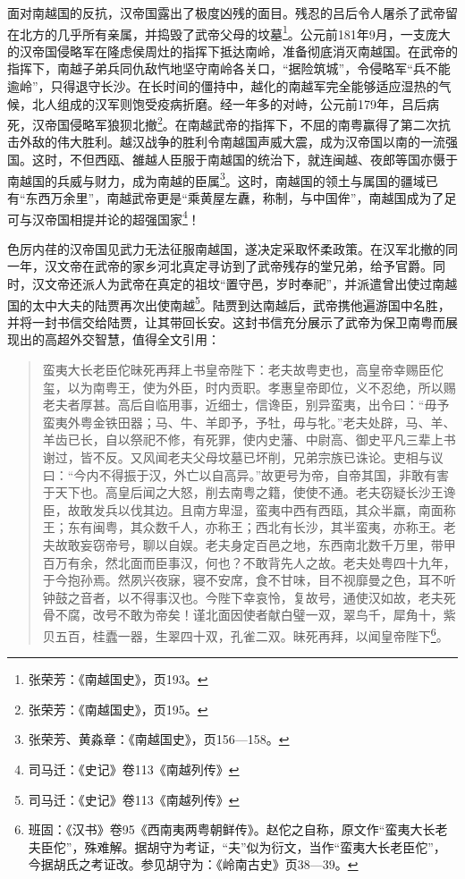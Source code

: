 面对南越国的反抗，汉帝国露出了极度凶残的面目。残忍的吕后令人屠杀了武帝留在北方的几乎所有亲属，并捣毁了武帝父母的坟墓\footnote{ 张荣芳：《南越国史》，页193。}。公元前181年9月，一支庞大的汉帝国侵略军在隆虑侯周灶的指挥下抵达南岭，准备彻底消灭南越国。在武帝的指挥下，南越子弟兵同仇敌忾地坚守南岭各关口，“据险筑城”，令侵略军“兵不能逾岭”，只得退守长沙。在长时间的僵持中，越化的南越军完全能够适应湿热的气候，北人组成的汉军则饱受疫病折磨。经一年多的对峙，公元前179年，吕后病死，汉帝国侵略军狼狈北撤\footnote{ 张荣芳：《南越国史》，页195。}。在南越武帝的指挥下，不屈的南粤赢得了第二次抗击外敌的伟大胜利。越汉战争的胜利令南越国声威大震，成为汉帝国以南的一流强国。这时，不但西瓯、雒越人臣服于南越国的统治下，就连闽越、夜郎等国亦慑于南越国的兵威与财力，成为南越的臣属\footnote{ 张荣芳、黄淼章：《南越国史》，页156—158。}。这时，南越国的领土与属国的疆域已有“东西万余里”，南越武帝更是“乘黄屋左纛，称制，与中国侔”，南越国成为了足可与汉帝国相提并论的超强国家\footnote{ 司马迁：《史记》卷113《南越列传》}！

色厉内荏的汉帝国见武力无法征服南越国，遂决定采取怀柔政策。在汉军北撤的同一年，汉文帝在武帝的家乡河北真定寻访到了武帝残存的堂兄弟，给予官爵。同时，汉文帝还派人为武帝在真定的祖坟“置守邑，岁时奉祀”，并派遣曾出使过南越国的太中大夫的陆贾再次出使南越\footnote{ 司马迁：《史记》卷113《南越列传》}。陆贾到达南越后，武帝携他遍游国中名胜，并将一封书信交给陆贾，让其带回长安。这封书信充分展示了武帝为保卫南粤而展现出的高超外交智慧，值得全文引用：

\begin{quote}
	蛮夷大长老臣佗昧死再拜上书皇帝陛下：老夫故粤吏也，高皇帝幸赐臣佗玺，以为南粤王，使为外臣，时内贡职。孝惠皇帝即位，义不忍绝，所以赐老夫者厚甚。高后自临用事，近细士，信谗臣，别异蛮夷，出令曰：“毋予蛮夷外粤金铁田器；马、牛、羊即予，予牡，毋与牝。”老夫处辟，马、羊、羊齿已长，自以祭祀不修，有死罪，使内史藩、中尉高、御史平凡三辈上书谢过，皆不反。又风闻老夫父母坟墓已坏削，兄弟宗族已诛论。吏相与议曰：“今内不得振于汉，外亡以自高异。”故更号为帝，自帝其国，非敢有害于天下也。高皇后闻之大怒，削去南粤之籍，使使不通。老夫窃疑长沙王谗臣，故敢发兵以伐其边。且南方卑湿，蛮夷中西有西瓯，其众半羸，南面称王；东有闽粤，其众数千人，亦称王；西北有长沙，其半蛮夷，亦称王。老夫故敢妄窃帝号，聊以自娱。老夫身定百邑之地，东西南北数千万里，带甲百万有余，然北面而臣事汉，何也？不敢背先人之故。老夫处粤四十九年，于今抱孙焉。然夙兴夜寐，寝不安席，食不甘味，目不视靡曼之色，耳不听钟鼓之音者，以不得事汉也。今陛下幸哀怜，复故号，通使汉如故，老夫死骨不腐，改号不敢为帝矣！谨北面因使者献白璧一双，翠鸟千，犀角十，紫贝五百，桂蠹一器，生翠四十双，孔雀二双。昧死再拜，以闻皇帝陛下\footnote{ 班固：《汉书》卷95《西南夷两粤朝鲜传》。赵佗之自称，原文作“蛮夷大长老夫臣佗”，殊难解。据胡守为考证，“夫”似为衍文，当作“蛮夷大长老臣佗”，今据胡氏之考证改。参见胡守为：《岭南古史》页38—39。}。
\end{quote}

